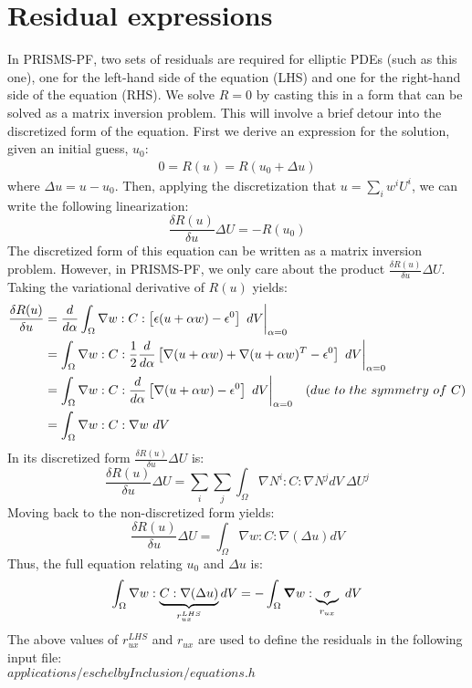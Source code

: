 \documentclass[10pt]{article}
\newcommand{\gv}[1]{\ensuremath{\mbox{\boldmath$ #1 $}}}
\newcommand{\grad}[1]{\gv{\nabla} #1}
\begin{document}
\section{Residual expressions}
In PRISMS-PF, two sets of residuals are required for elliptic PDEs (such as this one), one for the left-hand side of the equation (LHS) and one for the right-hand side of the equation (RHS). We solve $R=0$ by casting this in a form that can be solved as a matrix inversion problem. This will involve a brief detour into the discretized form of the equation. First we derive an expression for the solution, given an initial guess, $u_0$:
\begin{gather}
0 = R(u) = R(u_0 + \Delta u)
\end{gather}
where $\Delta u = u - u_0$. Then, applying the discretization that $u = \sum_i w^i U^i$, we can write the following linearization:
\begin{equation}
\frac{\delta R(u)}{\delta u} \Delta U = -R(u_0) \label{matrix_eqn}
\end{equation}
The discretized form of this equation can be written as a matrix inversion problem. However, in PRISMS-PF, we only care about the product $\frac{\delta R(u)}{\delta u} \Delta U$. Taking the variational derivative of $R(u)$ yields:
\begin{align}
\frac{\delta R(u)}{\delta u} &= \frac{d}{d\alpha} \int_{\Omega}   \nabla w :C: \left[ \epsilon (u+\alpha w) - \epsilon^0 \right] ~dV  \bigg{|}_{\alpha=0} \\
&=  \int_{\Omega}   \nabla w :C: \frac{1}{2}\frac{d}{d\alpha}\left[ \nabla(u+\alpha w) + \nabla(u+\alpha w)^T  - \epsilon^0\right] ~dV \bigg{|}_{\alpha=0}\\
&= \int_{\Omega}   \nabla w :C: \frac{d}{d\alpha} \left[ \nabla(u+\alpha w) - \epsilon^0 \right]  ~dV \bigg{|}_{\alpha=0} \quad (due ~to ~the ~symmetry ~of ~C) \\
&= \int_{\Omega}   \nabla w :C: \nabla w  ~dV 
\end{align}
In its discretized form $\frac{\delta R(u)}{\delta u} \Delta U$ is:
\begin{equation}
\frac{\delta R(u)}{\delta u} \Delta U = \sum_i \sum_j \int_{\Omega} \nabla N^i : C : \nabla N^j dV ~\Delta U^j
\end{equation}
Moving back to the non-discretized form yields:
\begin{equation}
\frac{\delta R(u)}{\delta u} \Delta U = \int_{\Omega} \nabla w : C : \nabla (\Delta u) dV
\end{equation}
Thus, the full equation relating $u_0$ and $\Delta u$ is:
\begin{equation}
\int_{\Omega} \nabla w : \underbrace{C : \nabla (\Delta u)}_{r_{ux}^{LHS}} dV = -\int_{\Omega}   \grad w : \underbrace{\sigma}_{r_{ux}} ~dV
\end{equation}
The above values of $r_{ux}^{LHS}$ and $r_{ux}$ are used to define the residuals in the following input file: \\
$applications/eschelbyInclusion/equations.h$
\end{document}
